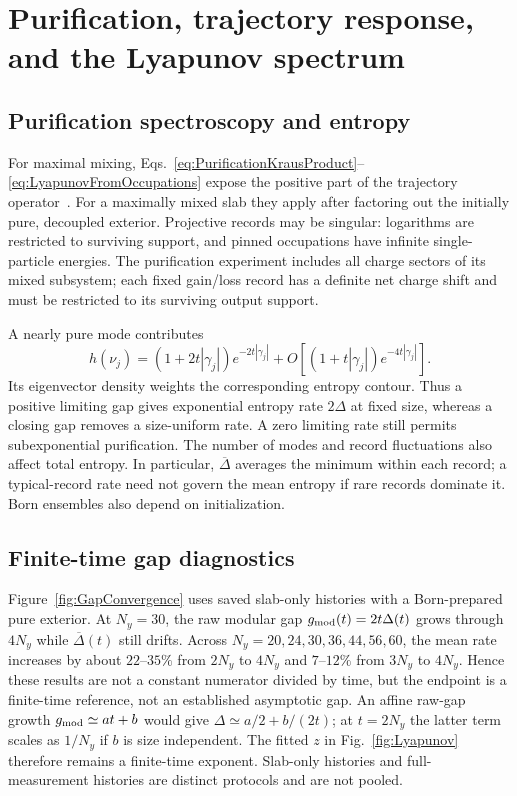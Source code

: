 \documentclass[aps,prb,10pt,twocolumn,superscriptaddress,longbibliography,floatfix]{revtex4-2}
\newcommand{\newtext}[1]{{\color{blue}#1}}
\begin{document}
\section{\newtext{Purification, trajectory response, and the Lyapunov spectrum}}
\label{app:Lyapunov}
{\color{blue}
\subsection{Purification spectroscopy and entropy}
\label{app:PurificationSpectroscopy}
For maximal mixing, Eqs.~\eqref{eq:PurificationKrausProduct}--\eqref{eq:LyapunovFromOccupations} expose the positive part of the trajectory operator~\cite{XiaoKawabata2026}. For a maximally mixed slab they apply after factoring out the initially pure, decoupled exterior. Projective records may be singular: logarithms are restricted to surviving support, and pinned occupations have infinite single-particle energies. The purification experiment includes all charge sectors of its mixed subsystem; each fixed gain/loss record has a definite net charge shift and must be restricted to its surviving output support.

A nearly pure mode contributes
\begin{equation}
 h(\nu_j)=(1+2t|\gamma_j|)e^{-2t|\gamma_j|}
 +O\!\left[(1+t|\gamma_j|)e^{-4t|\gamma_j|}\right].
 \label{eq:PurificationEntropyAsymptotic}
\end{equation}
Its eigenvector density weights the corresponding entropy contour. Thus a positive limiting gap gives exponential entropy rate $2\Delta$ at fixed size, whereas a closing gap removes a size-uniform rate. A zero limiting rate still permits subexponential purification. The number of modes and record fluctuations also affect total entropy. In particular, $\overline\Delta$ averages the minimum within each record; a typical-record rate need not govern the mean entropy if rare records dominate it. Born ensembles also depend on initialization.

\subsection{Finite-time gap diagnostics}
\label{app:FiniteTimeGap}
Figure~\ref{fig:GapConvergence} uses saved slab-only histories with a Born-prepared pure exterior. At $N_y=30$, the raw modular gap $g_{\rm mod}(t)=2t\Delta(t)$ grows through $4N_y$ while $\overline\Delta(t)$ still drifts. Across $N_y=20,24,30,36,44,56,60$, the mean rate increases by about $22$--$35\%$ from $2N_y$ to $4N_y$ and $7$--$12\%$ from $3N_y$ to $4N_y$. Hence these results are not a constant numerator divided by time, but the endpoint is a finite-time reference, not an established asymptotic gap. An affine raw-gap growth $g_{\rm mod}\simeq at+b$ would give $\Delta\simeq a/2+b/(2t)$; at $t=2N_y$ the latter term scales as $1/N_y$ if $b$ is size independent. The fitted $z$ in Fig.~\ref{fig:Lyapunov} therefore remains a finite-time exponent. Slab-only histories and full-measurement histories are distinct protocols and are not pooled.

}
\end{document}
